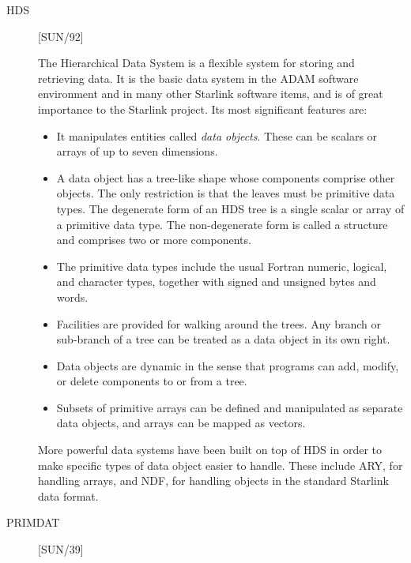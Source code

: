 \begin{description}
\item [HDS] \hfill [SUN/92]

The Hierarchical Data System is a flexible system for storing and retrieving
data.
It is the basic data system in the ADAM software environment and in many other
Starlink software items, and is of great importance to the Starlink project.
Its most significant features are:
\begin{itemize}
\item It manipulates entities called {\em data objects}.
 These can be scalars or arrays of up to seven dimensions.
\item A data object has a tree-like shape whose components comprise other
 objects. The only restriction is that the leaves must be primitive data
 types.  The degenerate form of an HDS tree is a single scalar or array of a
 primitive data type.  The non-degenerate form is called a structure and
 comprises two or more components.
\item The primitive data types include the usual Fortran numeric, logical, and
 character types, together with signed and unsigned bytes and words.
\item Facilities are provided for walking around the trees.  Any branch or
 sub-branch of a tree can be treated as a data object in its own right.
\item Data objects are dynamic in the sense that programs can add, modify,
 or delete components to or from a tree.
\item Subsets of primitive arrays can be defined and manipulated as separate
 data objects, and arrays can be mapped as vectors.
\end{itemize}
More powerful data systems have been built on top of HDS in order to make
specific types of data object easier to handle.
These include ARY, for handling arrays, and NDF, for handling objects in
the standard Starlink data format.

\item [PRIMDAT] \hfill [SUN/39]


\end{description}
